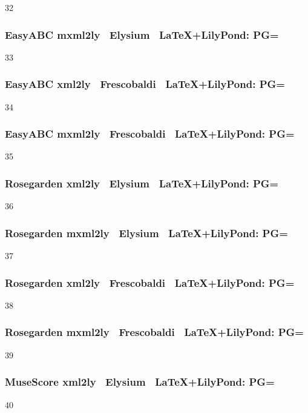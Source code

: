 32

\subsubsection{Easy\-ABC \ra mxml2ly \ra\ Elysium \ra\ \LaTeX+LilyPond: PG=} 

33

\subsubsection{Easy\-ABC \ra xml2ly \ra\ Frescobaldi \ra\ \LaTeX+LilyPond: PG=}

34

\subsubsection{Easy\-ABC \ra mxml2ly \ra\ Frescobaldi \ra\ \LaTeX+LilyPond: PG=} 

35

\subsubsection{Rosegarden \ra xml2ly \ra\ Elysium \ra\ \LaTeX+LilyPond: PG=}

36

\subsubsection{Rosegarden \ra mxml2ly \ra\ Elysium \ra\ \LaTeX+LilyPond: PG=}

37

\subsubsection{Rosegarden \ra xml2ly \ra\ Frescobaldi \ra\ \LaTeX+LilyPond: PG=}

38

\subsubsection{Rosegarden \ra mxml2ly \ra\ Frescobaldi \ra\ \LaTeX+LilyPond: PG=}

39

\subsubsection{MuseScore \ra xml2ly \ra\ Elysium \ra\ \LaTeX+LilyPond: PG=}

40

